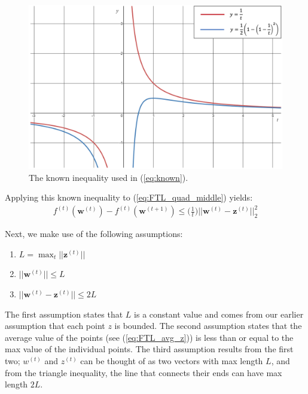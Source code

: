 \documentclass[11pt]{article}
\begin{document}
\begin{figure}[h]
\includegraphics[scale=0.5]{imgs/known.png}
\centering
\caption{The known inequality used in (\ref{eq:known}).}
\label{fig:known}
\end{figure}

Applying this known inequality to (\ref{eq:FTL_quad_middle}) yields:
\begin{align}
    f^{(t)}(\boldsymbol{w}^{(t)}) - f^{(t)}(\boldsymbol{w}^{(t+1)}) \leq \Big( \frac{1}{t} \Big) ||\boldsymbol{w}^{(t)} - \boldsymbol{z}^{(t)}||_2^2
    \label{eq:FTL_quad_end}
\end{align}

Next, we make use of the following assumptions:
\begin{enumerate}
    \item $L = \max_t ||\boldsymbol{z}^{(t)}||$
    \item $||\boldsymbol{w}^{(t)}|| \leq L$
    \item $||\boldsymbol{w}^{(t)} - \boldsymbol{z}^{(t)}|| \leq 2L$
\end{enumerate}

The first assumption states that $L$ is a constant value and comes from our earlier assumption that each point $z$ is bounded. The second assumption states that the average value of the points (see (\ref{eq:FTL_avg_z})) is less than or equal to the max value of the individual points. The third assumption results from the first two; $w^{(t)}$ and $z^{(t)}$ can be thought of as two vectors with max length $L$, and from the triangle inequality, the line that connects their ends can have max length $2L$.
\end{document}
